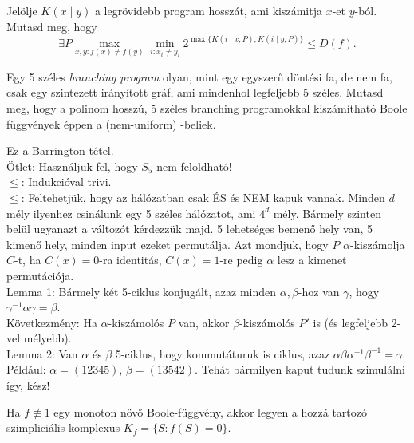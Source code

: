 \begin{Exercise}[counter={sorszam}, difficulty=0]
	Jel\"olje $K(x\mid y)$ a legr\"ovidebb program hossz\'at, ami kisz\'amitja $x$-et $y$-b\'ol. Mutasd meg, hogy $$\exists P\max_{x,y: f(x)\ne f(y)} \min_{i:x_i\ne y_i} 2^{\max\{K(i\mid x,P),K(i\mid y,P)\}} \le D(f).$$ %
\end{Exercise}


\begin{Exercise}[counter={sorszam}, difficulty=2]
	Egy 5 sz\'eles \emph{branching program} olyan, mint egy egyszer\H u d\"ont\'esi fa, de nem fa, csak egy szintezett ir\'any\'itott gr\'af, ami mindenhol legfeljebb 5 sz\'eles.
	Mutasd meg, hogy a polinom hossz\'u, 5 sz\'eles branching programokkal kisz\'am\'ithat\'o Boole f\"uggv\'enyek \'eppen a (nem-uniform) \NCone-beliek.
\end{Exercise}
\begin{Answer}
	Ez a Barrington-t\'etel.\\
	\"Otlet: Haszn\'aljuk fel, hogy $S_5$ nem feloldhat\'o!\\
	$\le$: Indukci\'oval trivi.\\
	$\le$: Feltehetj\"uk, hogy az \NCone h\'al\'ozatban csak \'ES \'es NEM kapuk vannak.
	Minden $d$ m\'ely ilyenhez csin\'alunk egy 5 sz\'eles h\'al\'ozatot, ami $4^d$ m\'ely.
	B\'armely szinten bel\"ul ugyanazt a v\'altoz\'ot k\'erdezz\"uk majd.
	5 lehets\'eges bemen\H o hely van, 5 kimen\H o hely, minden input ezeket permut\'alja.
	Azt mondjuk, hogy $P$ $\alpha$-kisz\'amolja $C$-t, ha $C(x)=0$-ra identit\'as, $C(x)=1$-re pedig $\alpha$ lesz a kimenet permut\'aci\'oja.\\
	Lemma 1: B\'armely k\'et 5-ciklus konjug\'alt, azaz minden $\alpha,\beta$-hoz van $\gamma$, hogy $\gamma^{-1}\alpha\gamma=\beta$.\\
	K\"ovetkezm\'eny: Ha $\alpha$-kisz\'amol\'os $P$ van, akkor $\beta$-kisz\'amol\'os $P'$ is (\'es legfeljebb 2-vel m\'elyebb).\\
	Lemma 2: Van $\alpha$ \'es $\beta$ 5-ciklus, hogy kommut\'aturuk is ciklus,
	azaz $\alpha\beta\alpha^{-1}\beta^{-1}=\gamma$.
	P\'eld\'aul: $\alpha= (1 2 3 4 5)$, $\beta = (1 3 5 4 2)$.
	Teh\'at b\'armilyen kaput tudunk szimul\'alni \'igy, k\'esz!
\end{Answer}

\bigskip
{} Ha $f\not\equiv 1$ egy monoton n\"ov\H o Boole-f\"uggv\'eny, akkor legyen a hozz\'a tartoz\'o szimplici\'alis komplexus $K_f=\{S: f(S)=0\}$.

